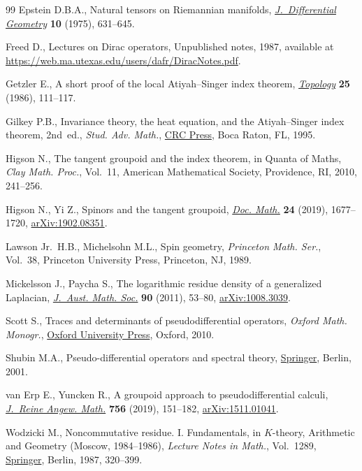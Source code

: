 \documentclass[10pt,a4paper]{amsart}
\providecommand{\LastPageEnding}{}
\numberwithin{equation}{section}
\theoremstyle{definition}
\begin{document}
\begin{thebibliography}{99}
Epstein D.B.A., Natural tensors on {R}iemannian manifolds,
 \href{https://doi.org/10.4310/jdg/1214433166}{\textit{J.~Differential Geometry}} \textbf{10} (1975), 631--645.

Freed D., Lectures on Dirac operators, {U}npublished notes, 1987, available at
 \url{https://web.ma.utexas.edu/users/dafr/DiracNotes.pdf}.

Getzler E., A short proof of the local {A}tiyah--{S}inger index theorem,
 \href{https://doi.org/10.1016/0040-9383(86)90008-X}{\textit{Topology}} \textbf{25} (1986), 111--117.

Gilkey P.B., Invariance theory, the heat equation, and the {A}tiyah--{S}inger
 index theorem, 2nd~ed., \textit{Stud. Adv. Math.}, \href{https://doi.org/10.1201/9780203749791}{CRC Press}, Boca Raton, FL, 1995.

Higson N., The tangent groupoid and the index theorem, in Quanta of Maths,
 \textit{Clay Math. Proc.}, Vol.~11, American Mathematical Society,
 Providence, RI, 2010, 241--256.

Higson N., Yi Z., Spinors and the tangent groupoid, \href{https://doi.org/10.4171/DM/712}{\textit{Doc. Math.}}
 \textbf{24} (2019), 1677--1720, \href{https://arxiv.org/abs/1902.08351}{arXiv:1902.08351}.

Lawson Jr.~H.B., Michelsohn M.L., Spin geometry, \textit{Princeton Math. Ser.},
 Vol.~38, Princeton University Press, Princeton, NJ, 1989.

Mickelsson J., Paycha S., The logarithmic residue density of a generalized
 {L}aplacian, \href{https://doi.org/10.1017/S144678871100108X}{\textit{J.~Aust. Math. Soc.}} \textbf{90} (2011), 53--80,
 \href{https://arxiv.org/abs/1008.3039}{arXiv:1008.3039}.

Scott S., Traces and determinants of pseudodifferential operators, \textit{Oxford Math.
 Monogr.}, \href{https://doi.org/10.1093/acprof:oso/9780198568360.001.0001}{Oxford University Press}, Oxford, 2010.

Shubin M.A., Pseudo-differential operators and spectral theory, \href{https://doi.org/10.1007/978-3-642-56579-3}{Springer},
 Berlin, 2001.

van Erp E., Yuncken R., A groupoid approach to pseudodifferential calculi,
 \href{https://doi.org/10.1515/crelle-2017-0035}{\textit{J.~Reine Angew. Math.}} \textbf{756} (2019), 151--182,
 \href{https://arxiv.org/abs/1511.01041}{arXiv:1511.01041}.

Wodzicki M., Noncommutative residue. {I}. {F}undamentals, in {$K$}-theory,
 Arithmetic and Geometry ({M}oscow, 1984--1986), \textit{Lecture Notes in
 Math.}, Vol.~1289, \href{https://doi.org/10.1007/BFb0078372}{Springer}, Berlin, 1987, 320--399.

\end{thebibliography}\LastPageEnding
\end{document}
